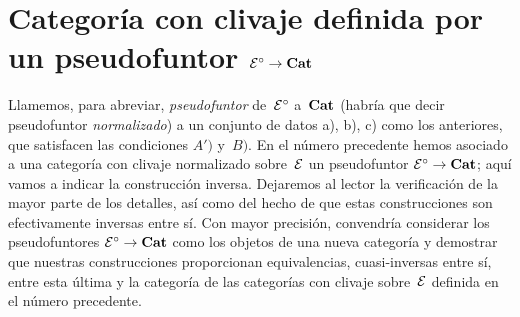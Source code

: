 \section[Categoría con clivaje definida por un pseudofuntor]{Categoría con clivaje definida por un pseudofuntor
$\mathcal{E}^\circ\to\Cat$} \label{VI.8}

Llamemos, para abreviar, \emph{pseudofuntor} de~$\cal{E}^\circ$
a~$\Cat$ (habría que decir pseudofuntor \emph{normalizado}) a un
conjunto de datos a), b), c) como los anteriores, que satisfacen las
condiciones $A')$ y~$B)$. En el número precedente hemos asociado a una
categoría con clivaje normalizado sobre~$\cal{E}$ un pseudofuntor
$\cal{E}^\circ\to\Cat$; aquí vamos a indicar la construcción inversa.
Dejaremos al lector la verificación de la mayor parte de los detalles, así
como del hecho de que estas construcciones son efectivamente inversas entre
sí. Con mayor precisión, convendría considerar los pseudofuntores
$\cal{E}^\circ\to\Cat$ como los objetos de una nueva categoría y demostrar
que nuestras construcciones proporcionan equivalencias, cuasi-inversas
entre sí, entre esta última y la categoría de las categorías con clivaje
sobre~$\cal{E}$ definida en el número precedente.

